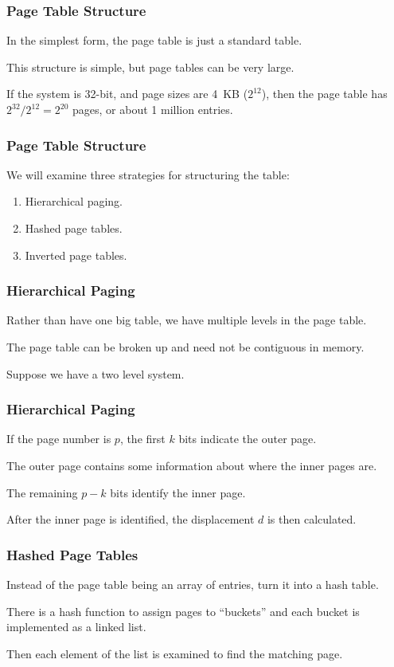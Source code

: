 \begin{frame}
\frametitle{Page Table Structure}

In the simplest form, the page table is just a standard table. 

This structure is simple, but page tables can be very large.

If the system is 32-bit, and page sizes are 4~KB ($2^{12}$), then the page table has $2^{32}/2^{12} = 2^{20}$ pages, or about 1 million entries.

\end{frame}

\begin{frame}
\frametitle{Page Table Structure}

We will examine three strategies for structuring the table:

\begin{enumerate}
	\item Hierarchical paging.
	\item Hashed page tables.
	\item Inverted page tables.
\end{enumerate}

\end{frame}

\begin{frame}
\frametitle{Hierarchical Paging}

Rather than have one big table, we have multiple levels in the page table. 

The page table can be broken up and need not be contiguous in memory. 

Suppose we have a two level system. 

\end{frame}

\begin{frame}
\frametitle{Hierarchical Paging}

If the page number is $p$, the first $k$ bits indicate the \alert{outer page}. 

The outer page contains some information about where the \alert{inner pages} are. 

The remaining $p-k$ bits identify the inner page. 

After the inner page is identified, the displacement $d$ is then calculated.


\end{frame}



\begin{frame}
\frametitle{Hashed Page Tables}

Instead of the page table being an array of entries, turn it into a hash table.

There is a hash function to assign pages to ``buckets'' and each bucket is implemented as a linked list. 
 
Then each element of the list is examined to find the matching page.

\end{frame}

